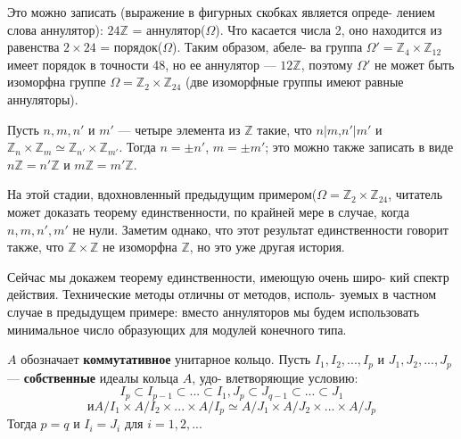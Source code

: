 \documentclass{mai_book}
\begin{document}
Это можно записать (выражение в фигурных скобках является опреде- \linebreak лением слова аннулятор): $24\mathbb{Z}$ = аннулятор($\Omega$). Что касается числа 2, \linebreak оно находится из равенства $2 \times 24$ = порядок($\Omega$). Таким образом, абеле- \linebreak ва группа ${\Omega}' = \mathbb{Z}_4 \times \mathbb{Z}_{12}$ имеет порядок в точности 48, но ее аннулятор --- \linebreak $12\mathbb{Z}$, поэтому ${\Omega}'$ не может быть изоморфна группе $\Omega = \mathbb{Z}_2 \times \mathbb{Z}_{24}$ (две \linebreak изоморфные группы имеют равные аннуляторы). 
\begin{predl}

Пусть $n, m, n'$ и $m'$ --- четыре элемента из $\mathbb{Z}$ такие, что $n | m$,\linebreak $n' | m'$ и $\mathbb{Z}_n \times \mathbb{Z}_m \simeq \mathbb{Z}_{n'} \times \mathbb{Z}_{m'}$. Тогда $n = \pm n'$, $m = \pm m'$; это можно \linebreak также записать в виде $n\mathbb{Z} = n'\mathbb{Z}$ и $m\mathbb{Z} = m' \mathbb{Z}$. 

На этой стадии, вдохновленный предыдущим примером\linebreak ($\Omega = \mathbb{Z}_2 \times \mathbb{Z}_{24}$, читатель может доказать теорему единственности, по \linebreak крайней мере в случае, когда $n, m, n', m'$ не нули. Заметим однако, что \linebreak этот результат единственности говорит также, что $\mathbb{Z} \times \mathbb{Z}$ не изоморфна \linebreak $\mathbb{Z}$, но это уже другая история. 

Сейчас мы докажем теорему единственности, имеющую очень широ- \linebreak кий спектр действия. Технические методы отличны от методов, исполь- \linebreak зуемых в частном случае в предыдущем примере: вместо аннуляторов \linebreak мы будем использовать минимальное число образующих для модулей \linebreak конечного типа.
\end{predl}
\begin{thm}[единственности.]

$A$ обозначает \textbf{коммутативное} унитарное кольцо. Пусть \linebreak $I_1, I_2, ..., I_p$ и $J_1, J_2, ..., J_p$ --- \textbf{собственные} идеалы кольца $A$, удо- \linebreak влетворяющие условию: 
$$I_p \subset I_{p-1}\subset ... \subset I_1, J_p \subset J_{q-1}\subset ... \subset J_1$$
$$и A/I_1 \times A/I_2 \times ... \times A/I_p \simeq A/J_1 \times A/J_2 \times ... \times A/J_p$$
Тогда $p = q$ и $I_i = J_i$ для $i = 1, 2, ...$ 
\end{thm}
\end{document}
